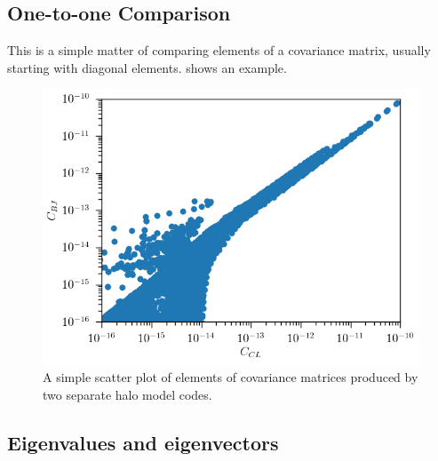 \documentclass[twocolumn]{\docclass}
\begin{document}
\subsection{One-to-one Comparison}

This is a simple matter of comparing elements of a covariance matrix, usually starting with diagonal elements.  shows an example.

\begin{figure}
\includegraphics[width=0.9\columnwidth]{xipmscatter.png}
\caption{A simple scatter plot of elements of covariance matrices produced by two separate halo model codes. \label{fig:xipmscatter}}
\end{figure}


\subsection{Eigenvalues and eigenvectors}
\end{document}

